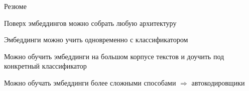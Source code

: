 \documentclass[notes,12pt, aspectratio=169]{beamer}
\newenvironment{wideitemize}{\itemize\addtolength{\itemsep}{10pt}}{\enditemize}
\begin{document}
\begin{frame}{Резюме}
	\begin{wideitemize} 
		\item  Поверх эмбеддингов можно собрать любую архитектуру
		\item  Эмбеддинги можно учить одновременно с классификатором
		\item  Можно обучить эмбеддинги на большом корпусе текстов и доучить под конкретный классификатор
		\item  Можно обучать эмбеддинги более сложными способами \alert{$\Rightarrow$ автокодировщики}
	\end{wideitemize} 
\end{frame} 
\end{document}
